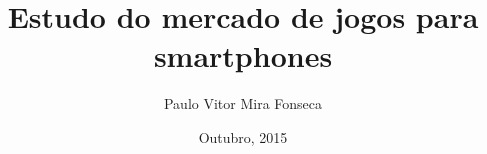 
\title{Estudo do mercado de jogos para smartphones}

\author{Paulo Vitor Mira Fonseca}

\address{São José dos Campos -- SP}
\date{Outubro, 2015}

\def\tocetcmark#1{\markboth{#1}{#1}}

